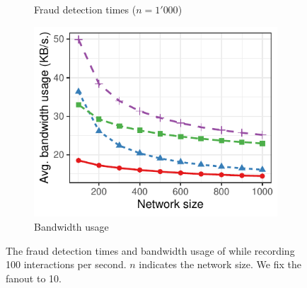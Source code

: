 \begin{figure}[t]
\begin{subfigure}{.66\columnwidth}
		\caption{Fraud detection times ($ n = 1'000 $)}
		\label{fig:fraud_experiment_detect_times_fixed_1000}
	\end{subfigure}
	\begin{subfigure}{.66\columnwidth}
		\centering
		\includegraphics[width=\columnwidth]{trustchain/assets/fraud_experiment_fixed_tx_bw}
		\caption{Bandwidth usage}
		\label{fig:fraud_experiment_fixed_tx_bw}
	\end{subfigure}%
	\caption{The fraud detection times and bandwidth usage of \ModelName{} while recording 100 interactions per second. $ n $ indicates the network size. We fix the fanout to 10.}
	\label{fig:fraud_experiments_fixed_tx}
\end{figure}

